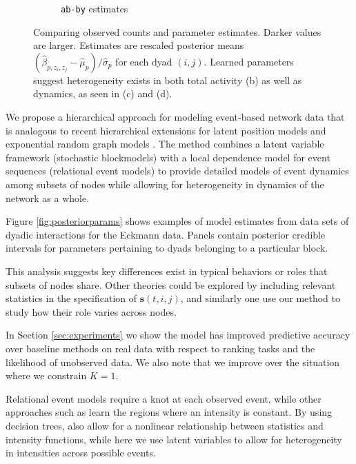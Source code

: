 \documentclass{article}
\begin{document}
\begin{figure}[t]
\begin{subfigure}[b]{0.22\textwidth}
\caption{\texttt{ab-by} estimates}
\end{subfigure}
\caption{Comparing observed counts and parameter estimates.  Darker values are larger.  Estimates are rescaled posterior means $(\hat{\beta}_{p,z_i,z_j} - \hat{\mu}_p)/\hat{\sigma}_p$ for each dyad $(i,j)$.  Learned parameters suggest heterogeneity exists in both total activity (b) as well as dynamics, as seen in (c) and (d).}
\label{fig:parmats}
\end{figure}

 We propose a hierarchical approach for modeling event-based network data that is analogous to recent hierarchical extensions for latent position models \cite{Handcock2007} and exponential random graph models \cite{Schweinberger2011}.  The method combines a latent variable framework (stochastic blockmodels) with a local dependence model for event sequences (relational event models) to provide detailed models of event dynamics among subsets of nodes while allowing for heterogeneity in dynamics of the network as a whole.

Figure \ref{fig:posteriorparams} shows examples of model estimates from data sets of dyadic interactions for the Eckmann data. Panels contain posterior credible intervals for parameters pertaining to dyads belonging to a particular block.  %

This analysis suggests key differences exist in typical behaviors or roles that subsets of nodes share.  Other theories could be explored by including relevant statistics in the specification of $\mathbf{s}(t,i,j)$, and similarly one use our method to study how their role varies across nodes.

In Section \ref{sec:experiments} we show the model has improved predictive accuracy over baseline methods on real data with respect to ranking tasks and the likelihood of unobserved data.  We also note that we improve over the situation where we constrain $K=1$.

Relational event models \cite{Butts2008} require a knot at each observed event, while other approaches such as \cite{Gunawardana2011} learn the regions where an intensity is constant.  By using decision trees,  \cite{Gunawardana2011} also allow for a nonlinear relationship between statistics and intensity functions, while here we use latent variables to allow for heterogeneity in intensities across possible events.
\end{document}
